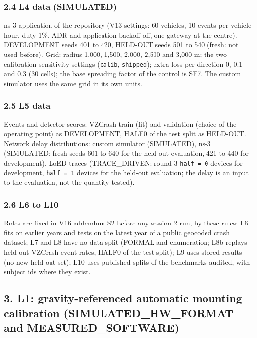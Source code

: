 \subsubsection*{2.4 L4 data (SIMULATED)}

ns-3 application of the repository (V13 settings: 60 vehicles, 10 events per vehicle-hour, duty 1\%, ADR and application backoff off, one gateway at the centre). DEVELOPMENT seeds 401 to 420, HELD-OUT seeds 501 to 540 (fresh: not used before). Grid: radius 1,000, 1,500, 2,000, 2,500 and 3,000 m; the two calibration sensitivity settings (\texttt{calib}, \texttt{shipped}); extra loss per direction 0, 0.1 and 0.3 (30 cells); the base spreading factor of the control is SF7. The custom simulator uses the same grid in its own units.

\subsubsection*{2.5 L5 data}

Events and detector scores: VZCrash train (fit) and validation (choice of the operating point) as DEVELOPMENT, HALF0 of the test split as HELD-OUT. Network delay distributions: custom simulator (SIMULATED), ns-3 (SIMULATED; fresh seeds 601 to 640 for the held-out evaluation, 421 to 440 for development), LoED traces (TRACE\_DRIVEN: round-3 \texttt{half = 0} devices for development, \texttt{half = 1} devices for the held-out evaluation; the delay is an input to the evaluation, not the quantity tested).

\subsubsection*{2.6 L6 to L10}

Roles are fixed in V16 addendum S2 before any session 2 run, by these rules: L6 fits on earlier years and tests on the latest year of a public geocoded crash dataset; L7 and L8 have no data split (FORMAL and enumeration; L8b replays held-out VZCrash event rates, HALF0 of the test split); L9 uses stored results (no new held-out set); L10 uses published splits of the benchmarks audited, with subject ids where they exist.

\subsection*{3. L1: gravity-referenced automatic mounting calibration (SIMULATED\_HW\_FORMAT and MEASURED\_SOFTWARE)}

